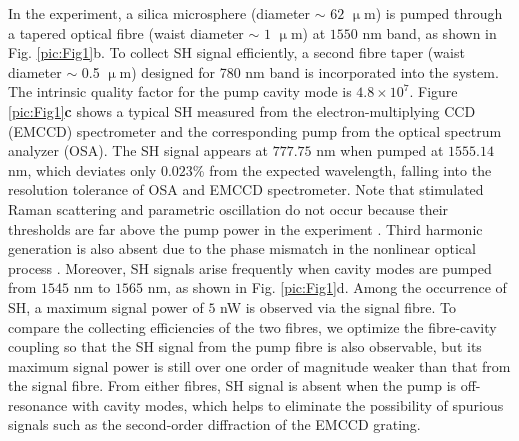 \documentclass[a4paper,8pt,hyperref, twocolumn, aps, prl]{article}
\begin{document}
In the experiment, a silica microsphere (diameter $\sim$ $62$ $\upmu$m)
is pumped through a tapered optical fibre (waist diameter $\sim$ $1$ $\upmu$m) at $1550$ nm band, as shown in Fig. \ref{pic:Fig1}b. To collect SH signal efficiently, a second fibre taper (waist diameter $\sim$ 0.5 $\upmu$m) designed for 780 nm band is incorporated into the system. The intrinsic quality factor for the pump cavity mode is $4.8\times10^7$.
Figure \ref{pic:Fig1}\textbf{c} shows a typical SH measured from the electron-multiplying CCD (EMCCD) spectrometer and the corresponding pump from the optical spectrum analyzer (OSA). The SH signal appears at $777.75$ nm when pumped at $1555.14$ nm, which deviates only $0.023$\% from the expected wavelength, falling into the resolution tolerance of OSA and EMCCD spectrometer.
Note that stimulated Raman scattering and parametric oscillation do not occur because their thresholds are far above the pump power in the experiment \cite{spillane2002ultralow, del2007optical}.
Third harmonic generation is also absent due to the phase mismatch in the nonlinear optical process \cite{carmon2007visible}.
Moreover, SH signals arise frequently when cavity modes are pumped from $1545$ nm to $1565$ nm, as shown in Fig. \ref{pic:Fig1}d.
Among the occurrence of SH, a maximum signal power of $5$ nW is observed via the signal fibre. 
To compare the collecting efficiencies of the two fibres, we optimize the fibre-cavity coupling so that the SH signal from the pump fibre is also observable, but its maximum signal power is still over one order of magnitude weaker than that from the signal fibre. From either fibres, SH signal is absent when the pump is off-resonance with cavity modes, which helps to eliminate the possibility of spurious signals such as the second-order diffraction of the EMCCD grating.
\end{document}
